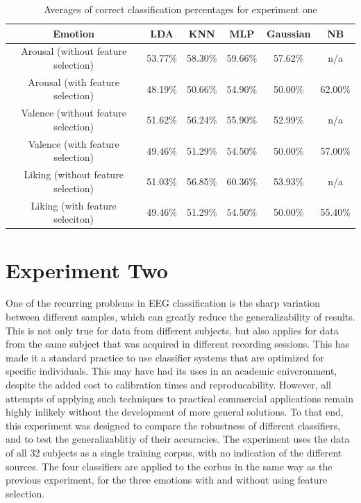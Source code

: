 \documentclass[12pt, a4paper, fleqn]{memoir}%
\begin{document}
\begin{table}[!h]
	\begin{tabular}{| c | c | c | c | c | c |}
		\hline \hline
		Emotion					& LDA	  & KNN	    & MLP     & Gaussian & NB      \\
		\hline \hline
		Arousal (without feature selection)	& 53.77\% & 58.30\% & 59.66\% & 57.62\%  & n/a     \\ \hline
		Arousal (with feature selection)        & 48.19\% & 50.66\% & 54.90\% & 50.00\%  & 62.00\% \\ \hline
		\hline
		Valence (without feature selection)     & 51.62\% & 56.24\% & 55.90\% & 52.99\%  & n/a     \\ \hline
		Valence (with feature selection)	& 49.46\% & 51.29\% & 54.50\% & 50.00\%	 & 57.00\% \\ \hline
		\hline
		Liking  (without feature selection)	& 51.03\% & 56.85\% & 60.36\% & 53.93\%  & n/a     \\ \hline
		Liking  (with feature seleciton)	& 49.46\% & 51.29\% & 54.50\% & 50.00\%  & 55.40\% \\ \hline
		\hline
	\end{tabular}
	\caption{Averages of correct classification percentages for experiment one}
	\label{table:exp1}
\end{table}

\section{Experiment Two}
\label{sec:exp2}
One of the recurring problems in EEG classification is the sharp variation between different samples, which can greatly reduce the generalizability of results. This is not only true for data from different subjects, but also applies for data from the same subject that was acquired in different recording sessions. This has made it a standard practice to use classifier systems that are optimized for specific individuals. This may have had its uses in an academic eniveronment, despite the added cost to calibration times and reproducability. However, all attempts of applying such techniques to practical commercial applications remain highly inlikely without the development of more general solutions. To that end, this experiment was designed to compare the robustness of different classifiers, and to test the generalizablitiy of their accuracies. The experiment uses the data of all 32 subjects as a single training corpus, with no indication of the different sources. The four classifiers are applied to the corbus in the same way as the previous experiment, for the three emotions with and without using feature selection.
\end{document}
